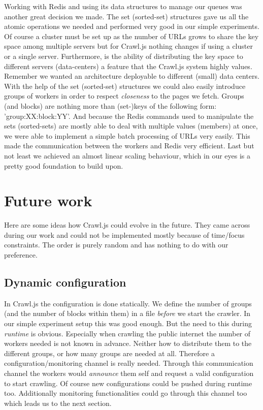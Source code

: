 Working with Redis and using its data structures to manage our queues was another great decision we made. The set (sorted-set) structures gave us all the atomic operations we needed and performed very good in our simple experiments. Of course a cluster must be set up as the number of URLs grows to share the key space among multiple servers but for Crawl.js nothing changes if using a cluster or a single server. Furthermore, is the ability of distributing the key space to different servers (data-centers) a feature that the Crawl.js system highly values. Remember we wanted an architecture deployable to different (small) data centers.
\newline
With the help of the set (sorted-set) structures we could also easily introduce groups of workers in order to respect \emph{closeness} to the pages we fetch. Groups (and blocks) are nothing more than (set-)keys of the following form: 'group:XX:block:YY'. And because the Redis commands used to manipulate the sets (sorted-sets) are mostly able to deal with multiple values (members) at once, we were able to implement a simple batch processing of URLs very easily. This made the communication between the workers and Redis very efficient.
\newline
Last but not least we achieved an almost linear scaling behaviour, which in our eyes is a pretty good foundation to build upon.

\section{Future work}
Here are some ideas how Crawl.js could evolve in the future. They came across during our work and could not be implemented mostly because of time/focus constraints. The order is purely random and has nothing to do with our preference.

\subsection{Dynamic configuration}
In Crawl.js the configuration is done statically. We define the number of groups (and the number of blocks within them) in a file \emph{before} we start the crawler. In our simple experiment setup this was good enough. But the need to this during \emph{runtime} is obvious. Especially when crawling the public internet the number of workers needed is not known in advance. Neither how to distribute them to the different groups, or how many groups are needed at all. Therefore a configuration/monitoring channel is really needed. Through this communication channel the workers would \emph{announce} them self and request a valid configuration to start crawling. Of course new configurations could be pushed during runtime too. Additionally monitoring functionalities could go through this channel too which leads us to the next section. 

